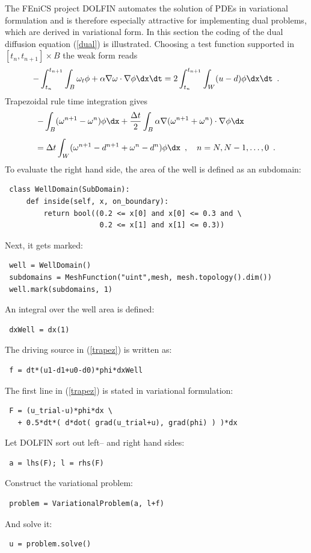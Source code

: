 The FEniCS project DOLFIN \cite{LoggWells2009} automates the solution of PDEs in variational formulation
and is therefore especially attractive for implementing dual problems,
which are derived in variational form.
In this section the coding of the dual diffusion equation
(\ref{dual}) is illustrated.
Choosing a test function supported in $[t_n, t_{n+1}] \times B$
the weak form reads
$$
 - \int_{t_n}^{t_{n+1}} \int_B \omega_t \phi + \alpha \nabla \omega \cdot \nabla \phi \dx \dt =
 2 \int_{t_n}^{t_{n+1}} \int_W (u-d) \phi \dx \dt \enspace .
$$
Trapezoidal rule time integration gives
\begin{equation} \label{trapez}
 \begin{array}{l}
 \displaystyle - \int_B (\omega^{n+1}-\omega^n) \phi \dx
     + \frac{\Delta t}{2} \int_B \alpha \nabla(\omega^{n+1}+\omega^n) \cdot \nabla \phi \dx \\[5mm]
 \displaystyle = \Delta t \int_W (\omega^{n+1} - d^{n+1} +\omega^n -d^n) \phi \dx
 \enspace , \quad n = N, N-1,\ldots, 0 \enspace .
 \end{array}
\end{equation}
To evaluate the right hand side, the area of the well is defined as an subdomain:
\begin{verbatim}
 class WellDomain(SubDomain):
     def inside(self, x, on_boundary):
         return bool((0.2 <= x[0] and x[0] <= 0.3 and \
                      0.2 <= x[1] and x[1] <= 0.3))
\end{verbatim}
Next, it gets marked:
\begin{verbatim}
 well = WellDomain()
 subdomains = MeshFunction("uint",mesh, mesh.topology().dim())
 well.mark(subdomains, 1)
\end{verbatim}
An integral over the well area is defined:
\begin{verbatim}
 dxWell = dx(1)
\end{verbatim}
\goodbreak

\noindent
The driving source in (\ref{trapez}) is written as:
\begin{verbatim}
 f = dt*(u1-d1+u0-d0)*phi*dxWell
\end{verbatim}
The first line in (\ref{trapez}) is stated in variational formulation:
\begin{verbatim}
 F = (u_trial-u)*phi*dx \
   + 0.5*dt*( d*dot( grad(u_trial+u), grad(phi) ) )*dx
\end{verbatim}
Let DOLFIN sort out left-- and right hand sides:
\begin{verbatim}
 a = lhs(F); l = rhs(F)
\end{verbatim}
Construct the variational problem:
\begin{verbatim}
 problem = VariationalProblem(a, l+f)
\end{verbatim}
And solve it:
\begin{verbatim}
 u = problem.solve()
\end{verbatim}


